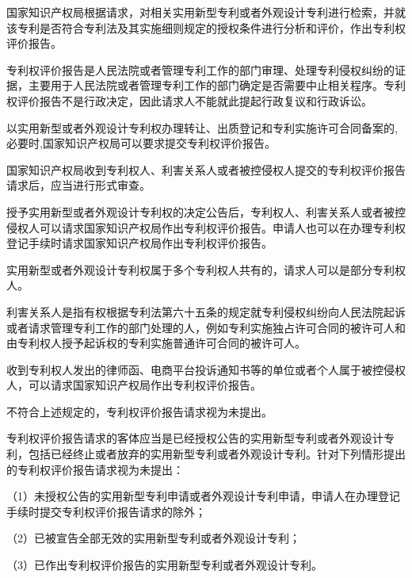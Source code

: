 国家知识产权局根据请求，对相关实用新型专利或者外观设计专利进行检索，并就该专利是否符合专利法及其实施细则规定的授权条件进行分析和评价，作出专利权评价报告。

专利权评价报告是人民法院或者管理专利工作的部门审理、处理专利侵权纠纷的证据，主要用于人民法院或者管理专利工作的部门确定是否需要中止相关程序。专利权评价报告不是行政决定，因此请求人不能就此提起行政复议和行政诉讼。

以实用新型或者外观设计专利权办理转让、出质登记和专利实施许可合同备案的,必要时,国家知识产权局可以要求提交专利权评价报告。

国家知识产权局收到专利权人、利害关系人或者被控侵权人提交的专利权评价报告请求后，应当进行形式审查。

授予实用新型或者外观设计专利权的决定公告后，专利权人、利害关系人或者被控侵权人可以请求国家知识产权局作出专利权评价报告。申请人也可以在办理专利权登记手续时请求国家知识产权局作出专利权评价报告。

实用新型或者外观设计专利权属于多个专利权人共有的，请求人可以是部分专利权人。

利害关系人是指有权根据专利法第六十五条的规定就专利侵权纠纷向人民法院起诉或者请求管理专利工作的部门处理的人，例如专利实施独占许可合同的被许可人和由专利权人授予起诉权的专利实施普通许可合同的被许可人。

收到专利权人发出的律师函、电商平台投诉通知书等的单位或者个人属于被控侵权人，可以请求国家知识产权局作出专利权评价报告。

不符合上述规定的，专利权评价报告请求视为未提出。

专利权评价报告请求的客体应当是已经授权公告的实用新型专利或者外观设计专利，包括已经终止或者放弃的实用新型专利或者外观设计专利。针对下列情形提出的专利权评价报告请求视为未提出：

{\setlength{\parindent}{17.1bp}（1）未授权公告的实用新型专利申请或者外观设计专利申请，申请人在办理登记手续时提交专利权评价报告请求的除外；\par}

{\setlength{\parindent}{17.1bp}（2）已被宣告全部无效的实用新型专利或者外观设计专利；\par}

{\setlength{\parindent}{17.1bp}（3）已作出专利权评价报告的实用新型专利或者外观设计专利。\par}

